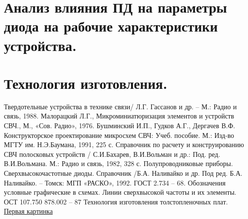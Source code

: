 \documentclass{bmstu}
\begin{document}
	\chapter{Анализ влияния ПД на параметры диода на рабочие характеристики устройства.}
	
	\chapter{Технология изготовления.} 
	
	
	\begin{thebibliography}{}
		 Твердотельные устройства в технике связи/ Л.Г. Гассанов и др. – М.: Радио и связь, 1988.
		 Малорацкий Л.Г., Микроминиатюризация элементов и устройств СВЧ., М., «Сов. Радио», 1976.
		 Бушминский И.П., Гудков А.Г., Дергачев В.Ф. Конструкторское проектирование микросхем СВЧ: Учеб. пособие. М.: Изд-во МГТУ им. Н.Э.Баумана, 1991, 225 с.
		 Справочник по расчету и конструированию СВЧ полосковых устройств / С.И.Бахарев, В.И.Вольман и др.: Под. ред. В.И.Вольмана. М.: Радио и связь, 1982, 328 с.
		 Полупроводниковые приборы. Сверхвысокочастотные диоды. Справочник /Б.А. Наливайко и др. Под ред. Б.А. Наливайко. – Томск: МГП «РАСКО», 1992.
		 ГОСТ 2.734 – 68. Обозначения условные графические в схемах. Линии сверхвысокой частоты и их элементы.
		 ОСТ 107.750 878.002 – 87   Технология изготовления толстопленочных плат.
		 \href{http://mart7157.narod.ru/voise_10.html}{Первая картинка}
	\end{thebibliography}
	
	
\end{document}
